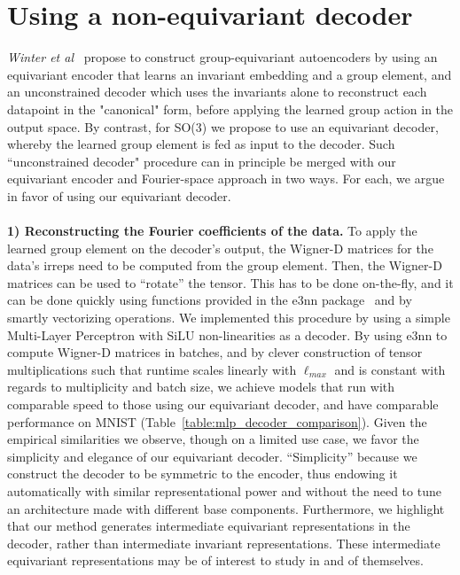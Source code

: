\section{Using a non-equivariant decoder}
\label{sec:mlp_decoder_appendix}
{\em Winter et al}~\cite{winter_unsupervised_2022} propose to construct group-equivariant
autoencoders by using an equivariant encoder that learns an invariant embedding and a group
element, and an unconstrained decoder which uses the invariants alone to reconstruct each datapoint
in the "canonical" form, before applying the learned group action in the output space. By contrast,
for SO(3) we propose to use an equivariant decoder, whereby the learned group element is fed as
input to the decoder. Such ``unconstrained decoder" procedure can in principle be merged with our
equivariant encoder and Fourier-space approach in two ways. For each, we argue in favor of using
our equivariant decoder.\\
\\
\textbf{1) Reconstructing the Fourier coefficients of the data.} To apply the learned group element
on the decoder’s output, the Wigner-D matrices for the data’s irreps need to be computed from the
group element. Then, the Wigner-D matrices can be used to “rotate” the tensor. This has to be done
on-the-fly, and it can be done quickly using functions provided in the e3nn
package~\cite{geiger_e3nn_2022} and by smartly vectorizing operations. We implemented this
procedure by using a simple Multi-Layer Perceptron with SiLU non-linearities as a decoder. By using
e3nn to compute Wigner-D matrices in batches, and by clever construction of tensor multiplications
such that runtime scales linearly with $\ell_{max}$ and is constant with regards to multiplicity
and batch size, we achieve models that run with comparable speed to those using our equivariant
decoder, and have comparable performance on MNIST (Table~\ref{table:mlp_decoder_comparison}). Given
the empirical similarities we observe, though on a limited use case, we favor the simplicity and
elegance of our equivariant decoder. “Simplicity” because we construct the decoder to be symmetric
to the encoder, thus endowing it automatically with similar representational power and without the
need to tune an architecture made with different base components. Furthermore, we highlight that
our method generates intermediate equivariant representations in the decoder, rather than
intermediate invariant representations. These intermediate equivariant representations may be of
interest to study in and of themselves.\\
